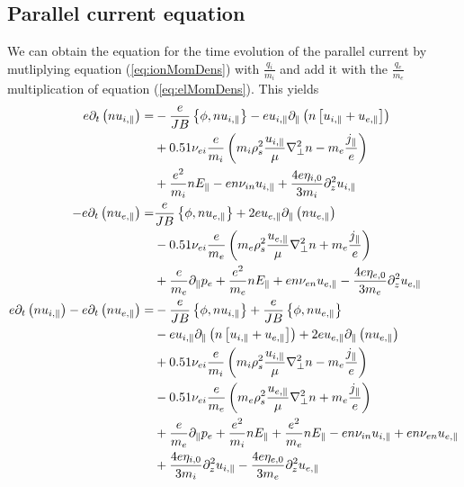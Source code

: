 \subsection{Parallel current equation}
%
We can obtain the equation for the time evolution of the parallel current by mutliplying equation (\ref{eq:ionMomDens}) with $\frac{q_i}{m_i}$ and add it with the $\frac{q_e}{m_e}$ multiplication of equation (\ref{eq:elMomDens}).
This yields
%
%
\begin{align*}
 e \partial_t\L( n u_{i,\|}\R)
 =&
 -\frac{e}{JB}\L\{\phi, n u_{i,\|}\R\}
 -e u_{i,\|}\partial_\|\L( n \L[u_{i,\|}+ u_{e,\|} \R]\R)
   \\&
 + 0.51 \nu_{ei}\frac{e}{m_i}\L(
   m_i \rho_s^2\frac{u_{i,\|}}{\mu} \grad_\perp^2 n
   - m_e \frac{j_\|}{e}
   \R)
   \\&
   +\frac{e^2}{m_i} n  E_\|
 - e n \nu_{i n}u_{i,\|}
 + \frac{4e\eta_{i,0}}{3m_i} \partial_z^2 u_{i,\|}
 \\
 -e \partial_t\L( n u_{e,\|}\R)
 =&
  \frac{e}{JB}\L\{\phi, n u_{e,\|}\R\}
 + 2e u_{e,\|}\partial_\|\L( n  u_{e,\|} \R)
   \\&
 - 0.51 \nu_{ei}\frac{e}{m_e}\L(
   m_e \rho_s^2\frac{u_{e,\|}}{\mu} \grad_\perp^2 n
   + m_e \frac{j_\|}{e}
   \R)
   \\&
   +\frac{e}{m_e} \partial_\| p_e
   + \frac{e^2}{m_e} n E_\|
 + en \nu_{e n}u_{e,\|}
 - \frac{4e\eta_{e,0}}{3m_e} \partial_z^2 u_{e,\|}
 \\
 e \partial_t\L( n u_{i,\|}\R)
 -e \partial_t\L( n u_{e,\|}\R)
 =&
 -\frac{e}{JB}\L\{\phi, n u_{i,\|}\R\}
 +\frac{e}{JB}\L\{\phi, n u_{e,\|}\R\}
   \\&
 -e u_{i,\|}\partial_\|\L( n \L[u_{i,\|}+ u_{e,\|} \R]\R)
 + 2e u_{e,\|}\partial_\|\L( n  u_{e,\|} \R)
   \\&
 + 0.51 \nu_{ei}\frac{e}{m_i}\L(
   m_i \rho_s^2\frac{u_{i,\|}}{\mu} \grad_\perp^2 n
   - m_e \frac{j_\|}{e}
   \R)
   \\&
 - 0.51 \nu_{ei}\frac{e}{m_e}\L(
   m_e \rho_s^2\frac{u_{e,\|}}{\mu} \grad_\perp^2 n
   + m_e \frac{j_\|}{e}
   \R)
   \\&
   +\frac{e}{m_e} \partial_\| p_e
   +\frac{e^2}{m_i} n  E_\|
   + \frac{e^2}{m_e}n E_\|
 - e n \nu_{i n}u_{i,\|}
 + en \nu_{e n}u_{e,\|}
   \\&
 + \frac{4e\eta_{i,0}}{3m_i} \partial_z^2 u_{i,\|}
 - \frac{4e\eta_{e,0}}{3m_e} \partial_z^2 u_{e,\|}
 \\

\end{align*}

